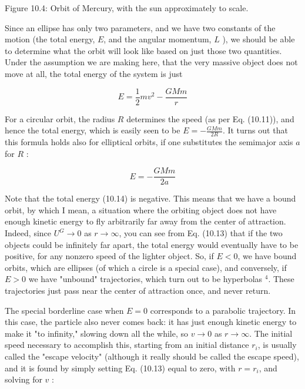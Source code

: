 \documentclass[10pt]{article}
\begin{document}
Figure 10.4: Orbit of Mercury, with the sun approximately to scale.

Since an ellipse has only two parameters, and we have two constants of the motion (the total energy, $E$, and the angular momentum, $L$ ), we should be able to determine what the orbit will look like based on just those two quantities. Under the assumption we are making here, that the very massive object does not move at all, the total energy of the system is just


\begin{equation*}
E=\frac{1}{2} m v^{2}-\frac{G M m}{r} \tag{10.13}
\end{equation*}


For a circular orbit, the radius $R$ determines the speed (as per Eq. (10.11)), and hence the total energy, which is easily seen to be $E=-\frac{G M m}{2 R}$. It turns out that this formula holds also for elliptical orbits, if one substitutes the semimajor axis $a$ for $R$ :


\begin{equation*}
E=-\frac{G M m}{2 a} \tag{10.14}
\end{equation*}


Note that the total energy (10.14) is negative. This means that we have a bound orbit, by which I mean, a situation where the orbiting object does not have enough kinetic energy to fly arbitrarily far away from the center of attraction. Indeed, since $U^{G} \rightarrow 0$ as $r \rightarrow \infty$, you can see from Eq. (10.13) that if the two objects could be infinitely far apart, the total energy would eventually have to be positive, for any nonzero speed of the lighter object. So, if $E<0$, we have bound orbits, which are ellipses (of which a circle is a special case), and conversely, if $E>0$ we have "unbound" trajectories, which turn out to be hyperbolas ${ }^{4}$. These trajectories just pass near the center of attraction once, and never return.

The special borderline case when $E=0$ corresponds to a parabolic trajectory. In this case, the particle also never comes back: it has just enough kinetic energy to make it "to infinity," slowing down all the while, so $v \rightarrow 0$ as $r \rightarrow \infty$. The initial speed necessary to accomplish this, starting from an initial distance $r_{i}$, is usually called the "escape velocity" (although it really should be called the escape speed), and it is found by simply setting Eq. (10.13) equal to zero, with $r=r_{i}$, and solving for $v$ :
\end{document}
